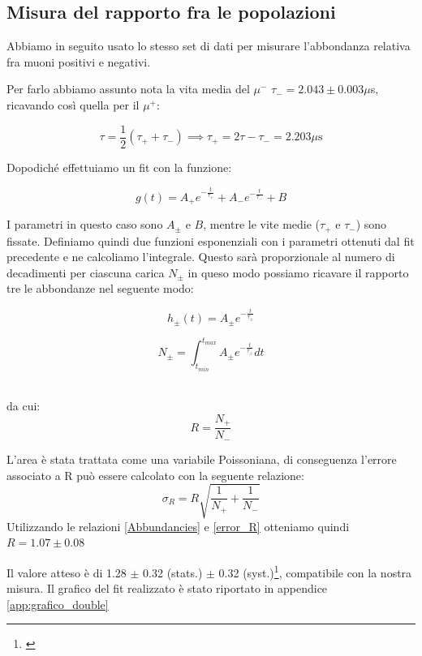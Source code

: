 \documentclass[10pt,a4paper]{article}
\begin{document}
\subsection{Misura del rapporto fra le popolazioni}\label{subsec:rapporto}
\begin{flushleft}
Abbiamo in seguito usato lo stesso set di dati per misurare l'abbondanza relativa fra muoni positivi e negativi. 

Per farlo abbiamo assunto nota la vita media del $\mu^{-}$ $\tau_{-}= 2.043\pm0.003 \mu$s, ricavando così quella per il $\mu^{+}$: 

\begin{equation}
    \label{mean_life_tot}
    \tau = \frac{1}{2}(\tau_{+}+\tau_{-}) \implies \tau_{+} = 2\tau -\tau_{-}= 2.203 \mu \text{s}
\end{equation}

Dopodiché effettuiamo un fit con la funzione:

\begin{equation}
    \label{fit_func_2}
    g(t) = A_{+}e^{-\frac{t}{\tau_+}}+A_{-}e^{-\frac{t}{\tau_-}} + B
\end{equation}

I parametri in questo caso sono $A_{\pm}$ e $B$, mentre le vite medie ($\tau_+$ e $\tau_-$) sono fissate. Definiamo quindi due funzioni esponenziali con i parametri ottenuti dal fit precedente e ne calcoliamo l'integrale. Questo sarà proporzionale al numero di decadimenti per ciascuna carica $N_{\pm}$ in queso modo possiamo ricavare il rapporto tre le abbondanze nel seguente modo:\\
\begin{minipage}{0.45\linewidth}
\centering
\begin{equation}
    \label{height_muon}
    h_{\pm}(t) = A_{\pm}e^{-\frac{t}{\tau_{\pm}}}
\end{equation}
\end{minipage}
\hfill
\begin{minipage}{0.45\linewidth}
\centering
\begin{equation}
    \label{Number_muon}
    N_{\pm} =\int _{t_{min}}^{t_{max}}  A_{\pm}e^{-\frac{t}{\tau_{\pm}}} dt
\end{equation}
\end{minipage}\\
da cui:
\begin{equation}
    \label{Abbundancies}
    R = \frac{N_+}{N_-}
\end{equation}


L'area è stata trattata come una variabile Poissoniana, di conseguenza l'errore associato a R può essere calcolato con la seguente relazione:
\begin{equation}
    \label{error_R}
    \sigma_R = R\sqrt{\frac{1}{N_+}+\frac{1}{N_-}}
\end{equation}
Utilizzando le relazioni \ref{Abbundancies} e \ref{error_R} otteniamo quindi $R = 1.07 \pm 0.08$

Il valore atteso è di 1.28 $\pm$ 0.32 (stats.) $\pm$ 0.32 (syst.)\footnote{\cite{CMSChargeRatio2010}}, compatibile con la nostra misura.
Il grafico del fit realizzato è stato riportato in appendice \ref{app:grafico_double}

\end{flushleft}
\end{document}
